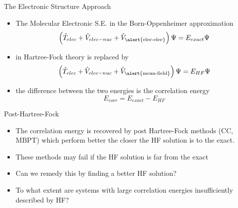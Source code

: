 \documentclass[10pt]{beamer}
\begin{document}
\begin{frame}{The Electronic Structure Approach}
	\begin{itemize}[<+->]
		\item {The Molecular Electronic S.E. in the Born-Oppenheimer approximation
		  \begin{equation*}
  		  \left( 
        \hat{T}_{elec} + \hat{V}_{elec-nuc} 
                       + \hat{V}_{\textrm{\alert{elec-elec}}} 
  		 \right)
  		 \Psi
  		  = E_{exact}\Psi
		  \end{equation*}
		}
		\item {in Hartree-Fock theory is replaced by
		  \begin{equation*}
  		  \left( 
        \hat{T}_{elec} + \hat{V}_{elec-nuc} + 
  		   \hat{V}_{\textrm{\alert{mean-field}}} 
  		 \right)
  		 \Psi
  		  = E_{HF}\Psi
		  \end{equation*}
		}
		\item {the difference between the two energies is the \alert{correlation energy}
		  \begin{equation*}
		    E_{corr} = E_{exact} - E_{HF}
		  \end{equation*}
    }

	\end{itemize}
\end{frame}

\begin{frame}{Post-Hartree-Fock}
  \begin{itemize}
    \item {The correlation energy is recovered by post Hartree-Fock methods (CC, MBPT)
    which perform better the closer the HF solution is to the exact.} 
    \item {These methods may fail if the HF solution is far from the exact}
    \item {Can we remedy this by finding a better HF solution?}
    \item {To what extent are systems with large correlation energies insufficiently described by 
    HF?} 
  \end{itemize}
\end{frame}
\end{document}
